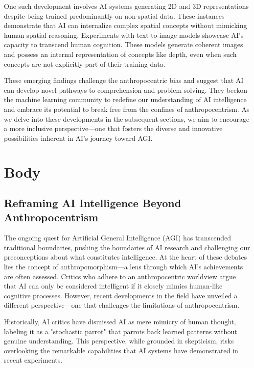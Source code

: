 \documentclass{article}
\begin{document}
One such development involves AI systems generating 2D and 3D representations despite being trained predominantly on non-spatial data. 
These instances demonstrate that AI can internalize complex spatial concepts without mimicking human spatial reasoning. 
Experiments with text-to-image models showcase AI's capacity to transcend human cognition. 
These models generate coherent images and possess an internal representation of concepts like depth, even when such concepts are not explicitly part of their training data. \cite{chen2023beyond} \par

These emerging findings challenge the anthropocentric bias and suggest that AI can develop novel pathways to comprehension and problem-solving. 
They beckon the machine learning community to redefine our understanding of AI intelligence and embrace its potential to break free from the confines of anthropocentrism. 
As we delve into these developments in the subsequent sections, we aim to encourage a more inclusive perspective—one that fosters the diverse and innovative possibilities inherent in AI's journey toward AGI.\par

\section{Body}

\subsection{Reframing AI Intelligence Beyond Anthropocentrism}

The ongoing quest for Artificial General Intelligence (AGI) has transcended traditional boundaries, pushing the boundaries of AI research and challenging our preconceptions about what constitutes intelligence. 
At the heart of these debates lies the concept of anthropomorphism—a lens through which AI's achievements are often assessed. 
Critics who adhere to an anthropocentric worldview argue that AI can only be considered intelligent if it closely mimics human-like cognitive processes. 
However, recent developments in the field have unveiled a different perspective—one that challenges the limitations of anthropocentrism.\par

Historically, AI critics have dismissed AI as mere mimicry of human thought, labeling it as a "stochastic parrot" that parrots back learned patterns without genuine understanding. 
This perspective, while grounded in skepticism, risks overlooking the remarkable capabilities that AI systems have demonstrated in recent experiments.\par
\end{document}

